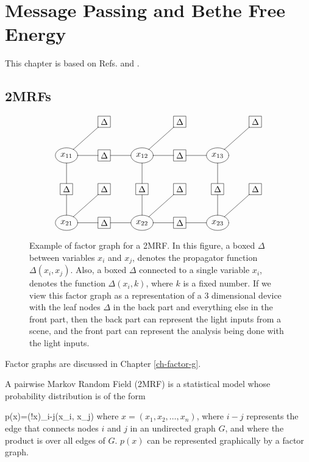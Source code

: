 \chapter{Message Passing and 
Bethe Free Energy}
\label{ch-mpass-bethe}

\newcommand{\ttheta}[0]{\TIL{\theta}}
\newcommand{\tP}[0]{\TIL{p}}

This chapter is based
on Refs. \cite{WainJordan}
and \cite{yedidia}.

\section{2MRFs}



\begin{figure}[h!]
$$\xymatrix{
&*+[F]{\Delta}
&
&*+[F]{\Delta}
&
&*+[F]{\Delta}
\\
*++[o][F]{x_{11}}
\ar@{-}[d]\ar@{-}[r]\ar@{-}[ru]
&*+[F]{\Delta}\ar@{-}[r]
&*++[o][F]{x_{12}}\ar@{-}[d]\ar@{-}[r]
\ar@{-}[ru]
&*+[F]{\Delta}\ar@{-}[r]
&*++[o][F]{x_{13}}\ar@{-}[d]
\ar@{-}[ru]
\\
*+[F]{\Delta}\ar@{-}[d]
&*+[F]{\Delta}
&*+[F]{\Delta}\ar@{-}[d]
&*+[F]{\Delta}
&*+[F]{\Delta}\ar@{-}[d]
&*+[F]{\Delta}
\\
*++[o][F]{x_{21}}\ar@{-}[r]\ar@{-}[ru]
&*+[F]{\Delta}\ar@{-}[r]
&*++[o][F]{x_{22}}\ar@{-}[r]\ar@{-}[ru]
&*+[F]{\Delta}\ar@{-}[r]
&*++[o][F]{x_{23}}\ar@{-}[ru]
}$$
\caption{Example
of factor graph
for a 2MRF.
In this figure,
a boxed $\Delta$
between variables $x_i$
and $x_j$,
denotes the propagator  function
$\Delta(x_i, x_j)$.
Also, a boxed
$\Delta$
connected to a
single variable $x_i$,
denotes the function
$\Delta(x_i, k)$,
where $k$
is a fixed number.
If we view this factor graph
as a representation of a 3 dimensional device
with the leaf nodes $\Delta$
in the back part and everything else in the front part,
then the back part can represent the light inputs from a scene, and the front part
can represent the analysis being done 
with the light inputs.
}
\label{fig-paiwise-mrf}
\end{figure}

Factor graphs
are discussed in Chapter \ref{ch-factor-g}.

A pairwise Markov Random Field (2MRF)
is a statistical model 
whose probability
distribution
is of the form

\beq
p(x)=\caln(!x)\prod_{i-j}\Delta(x_i, x_j)
\label{eq-2mrf}
\eeq
where $x=(x_1, x_2,
\ldots, x_n )$,
where $i-j$
represents the edge
that connects
nodes $i$ and $j$
in an undirected graph $G$,
and where  the product 
is over all edges of $G$.
$p(x)$ can be represented
graphically
by a factor graph.

